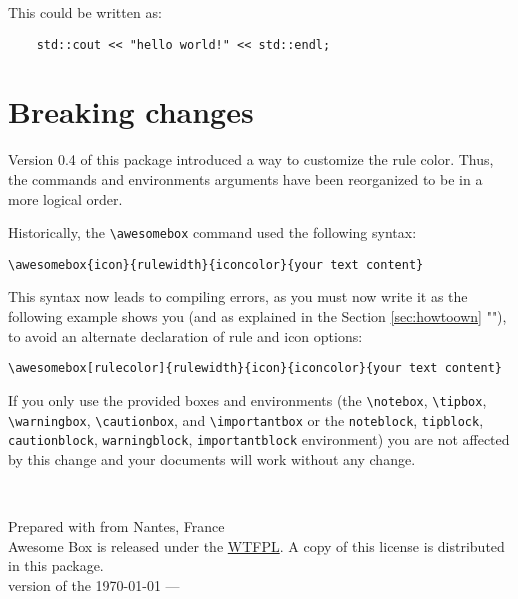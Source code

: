 \documentclass[a4paper,12pt]{article}
\newcommand{\colophon}{
  ~\vfill
  \begin{center}
    \scriptsize Prepared with \faHeart{} from Nantes,
    France\\
    Awesome Box is released under the
    \hrefcolor{http://www.wtfpl.net/txt/copying/}{WTFPL}. A copy of this
    license is distributed in this package.\\
    \tiny version of the \today{} --- \currenttime
  \end{center}
}
\newcommand\hrefcolor[2]{\textcolor{magenta}{\href{#1}{#2}}}
\begin{document}
\begin{noteblock}
  This could be written as:

  \begin{verbatim}
    std::cout << "hello world!" << std::endl;
  \end{verbatim}
\end{noteblock}

\section{Breaking changes}

Version 0.4 of this package introduced a way to customize the rule
color. Thus, the commands and environments arguments have been
reorganized to be in a more logical order.

Historically, the \verb!\awesomebox! command used the following syntax:

\begin{center}
\verb!\awesomebox{icon}{rulewidth}{iconcolor}{your text content}!
\end{center}

This syntax now leads to compiling errors, as you must now write it
as the following example shows you (and as explained in the Section
\ref{sec:howtoown} ""), to avoid an alternate
declaration of rule and icon options:

\begin{center}
\verb!\awesomebox[rulecolor]{rulewidth}{icon}{iconcolor}{your text content}!
\end{center}

If you only use the provided boxes and environments (the
\verb!\notebox!, \verb!\tipbox!, \verb!\warningbox!, \verb!\cautionbox!,
and \verb!\importantbox! or the \texttt{noteblock}, \texttt{tipblock},
\texttt{cautionblock}, \texttt{warningblock}, \texttt{importantblock}
environment) you are not affected by this change and your documents will
work without any change.

\colophon
\end{document}
